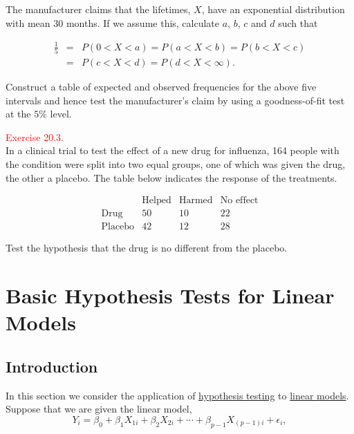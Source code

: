 \documentclass[
]{book}
\begin{document}
The manufacturer claims that the lifetimes, \(X\), have an exponential distribution with mean 30 months. If we assume this, calculate \(a\), \(b\), \(c\) and \(d\) such that

\begin{eqnarray*} \frac{1}{5} &=& P(0 < X <a) = P(a<X<b) = P(b < X <c) \\
&=& P(c < X< d) = P(d < X < \infty). 
\end{eqnarray*}

Construct a table of expected and observed frequencies for the above five intervals and hence test the manufacturer's claim by using a goodness-of-fit test at the \(5\%\) level.

\hfill\break

\hypertarget{exer20.3}{}
\textcolor{red}{Exercise 20.3.}\\
In a clinical trial to test the effect of a new drug for influenza, 164 people with the condition were split into two equal groups, one of which was given the drug, the
other a placebo. The table below indicates the response of the treatments.

\[ \begin{array}{l|ccc} & \mbox{Helped} & \mbox{Harmed} & \mbox{No effect} \\
\hline \mbox{Drug} & 50 & 10 & 22 \\
\mbox{Placebo} & 42 & 12 & 28 \end{array} \]

Test the hypothesis that the drug is no different from the placebo.

\hypertarget{Sec_Linear_hypo_test}{%
\chapter{Basic Hypothesis Tests for Linear Models}\label{Sec_Linear_hypo_test}}

\hypertarget{Sec_Linear_hypo_test:intro}{%
\section{Introduction}\label{Sec_Linear_hypo_test:intro}}

In this section we consider the application of \protect\hyperlink{Sec_Hypo_Test}{hypothesis testing} to \protect\hyperlink{Sec_LinearI}{linear models}. Suppose that we are given the linear model,\\

\[ Y_i = \beta_0 + \beta_1 X_{1i} + \beta_2 X_{2i} + \cdots + \beta_{p-1} X_{(p-1)i} + \epsilon_i,\]
\end{document}
